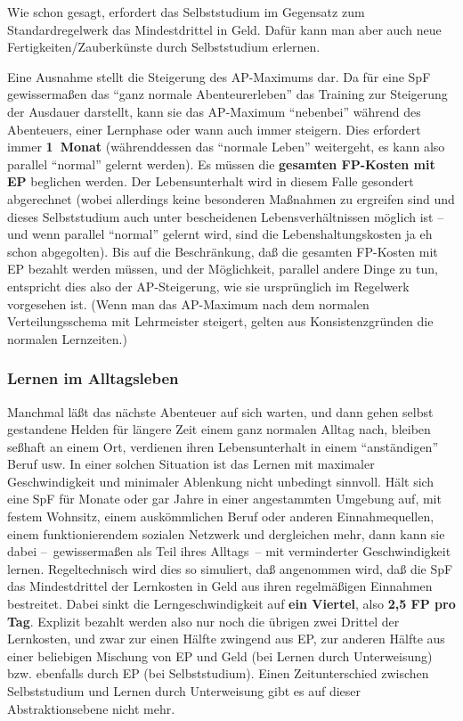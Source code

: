 \documentclass[10pt,a4paper,germanpar]{article}
\begin{document}
Wie schon gesagt, erfordert das Selbststudium im Gegensatz zum
Standardregelwerk das Mindestdrittel in Geld. Dafür kann man aber auch
neue Fertigkeiten/Zauberkünste durch Selbststudium erlernen.

Eine Ausnahme stellt die Steigerung des AP-Maximums dar. Da für eine
SpF gewissermaßen das "`ganz normale Abenteurerleben"' das Training
zur Steigerung der Ausdauer darstellt, kann sie das AP-Maximum
"`nebenbei"' während des Abenteuers, einer Lernphase oder wann auch
immer steigern. Dies erfordert immer \textbf{1~Monat} (währenddessen
das "`normale Leben"' weitergeht, es kann also parallel "`normal"'
gelernt werden). Es müssen die \textbf{gesamten FP-Kosten mit EP}
beglichen werden. Der Lebensunterhalt wird in diesem Falle gesondert
abgerechnet (wobei allerdings keine besonderen Maßnahmen zu ergreifen
sind und dieses Selbststudium auch unter bescheidenen
Lebensverhältnissen möglich ist -- und wenn parallel "`normal"'
gelernt wird, sind die Lebenshaltungskosten ja eh schon
abgegolten). Bis auf die Beschränkung, daß die gesamten FP-Kosten mit
EP bezahlt werden müssen, und der Möglichkeit, parallel andere Dinge
zu tun, entspricht dies also der AP-Steigerung, wie sie ursprünglich
im Regelwerk vorgesehen ist. (Wenn man das AP-Maximum nach dem
normalen Verteilungsschema mit Lehrmeister steigert, gelten aus
Konsistenzgründen die normalen Lernzeiten.)

\subsubsection{Lernen im Alltagsleben}

Manchmal läßt das nächste Abenteuer auf sich warten, und dann gehen
selbst gestandene Helden für längere Zeit einem ganz normalen Alltag
nach, bleiben seßhaft an einem Ort, verdienen ihren Lebensunterhalt in
einem "`anständigen"' Beruf usw. In einer solchen Situation ist das
Lernen mit maximaler Geschwindigkeit und minimaler Ablenkung nicht
unbedingt sinnvoll. Hält sich eine SpF für Monate oder gar Jahre in
einer angestammten Umgebung auf, mit festem Wohnsitz, einem
auskömmlichen Beruf oder anderen Einnahmequellen, einem
funktionierendem sozialen Netzwerk und dergleichen mehr, dann kann sie
dabei --~gewissermaßen als Teil ihres Alltags~-- mit verminderter
Geschwindigkeit lernen. Regeltechnisch wird dies so simuliert, daß
angenommen wird, daß die SpF das Mindestdrittel der Lernkosten in Geld
aus ihren regelmäßigen Einnahmen bestreitet. Dabei sinkt die
Lerngeschwindigkeit auf \textbf{ein Viertel}, also \textbf{2,5 FP pro
  Tag}. Explizit bezahlt werden also nur noch die übrigen zwei Drittel
der Lernkosten, und zwar zur einen Hälfte zwingend aus EP, zur anderen
Hälfte aus einer beliebigen Mischung von EP und Geld (bei Lernen
durch Unterweisung) bzw. ebenfalls durch EP (bei Selbststudium). Einen
Zeitunterschied zwischen Selbststudium und Lernen durch Unterweisung
gibt es auf dieser Abstraktionsebene nicht mehr.
\end{document}
